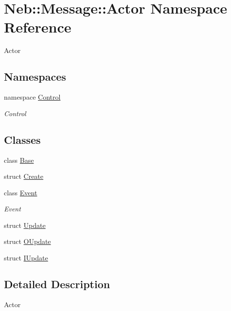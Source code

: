 \hypertarget{namespaceNeb_1_1Message_1_1Actor}{\section{\-Neb\-:\-:\-Message\-:\-:\-Actor \-Namespace \-Reference}
\label{namespaceNeb_1_1Message_1_1Actor}
}


\-Actor  


\subsection*{\-Namespaces}
\begin{DoxyCompactItemize}
\item 
namespace \hyperlink{namespaceNeb_1_1Message_1_1Actor_1_1Control}{\-Control}
\begin{DoxyCompactList}\small\item\em \-Control \end{DoxyCompactList}\end{DoxyCompactItemize}
\subsection*{\-Classes}
\begin{DoxyCompactItemize}
\item 
class \hyperlink{classNeb_1_1Message_1_1Actor_1_1Base}{\-Base}
\item 
struct \hyperlink{structNeb_1_1Message_1_1Actor_1_1Create}{\-Create}
\item 
class \hyperlink{classNeb_1_1Message_1_1Actor_1_1Event}{\-Event}
\begin{DoxyCompactList}\small\item\em \-Event \end{DoxyCompactList}\item 
struct \hyperlink{structNeb_1_1Message_1_1Actor_1_1Update}{\-Update}
\item 
struct \hyperlink{structNeb_1_1Message_1_1Actor_1_1OUpdate}{\-O\-Update}
\item 
struct \hyperlink{structNeb_1_1Message_1_1Actor_1_1IUpdate}{\-I\-Update}
\end{DoxyCompactItemize}


\subsection{\-Detailed \-Description}
\-Actor 